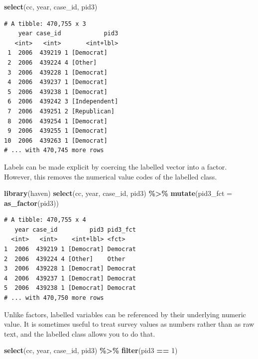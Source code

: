 \documentclass[10pt,article,oneside]{memoir}
\theoremstyle{definition}
\newenvironment{Shaded}{\begin{snugshade}}{\end{snugshade}}
\newcommand{\DataTypeTok}[1]{\textcolor[rgb]{0.13,0.29,0.53}{#1}}
\newcommand{\DecValTok}[1]{\textcolor[rgb]{0.00,0.00,0.81}{#1}}
\newcommand{\KeywordTok}[1]{\textcolor[rgb]{0.13,0.29,0.53}{\textbf{#1}}}
\newcommand{\NormalTok}[1]{#1}
\newcommand{\OperatorTok}[1]{\textcolor[rgb]{0.81,0.36,0.00}{\textbf{#1}}}
\newcommand{\StringTok}[1]{\textcolor[rgb]{0.31,0.60,0.02}{#1}}
\begin{document}
\begin{Shaded}
\begin{Highlighting}[]
\KeywordTok{select}\NormalTok{(cc, year, case\_id, pid3)}
\end{Highlighting}
\end{Shaded}

\begin{verbatim}
# A tibble: 470,755 x 3
    year case_id            pid3
   <int>   <int>       <int+lbl>
 1  2006  439219 1 [Democrat]   
 2  2006  439224 4 [Other]      
 3  2006  439228 1 [Democrat]   
 4  2006  439237 1 [Democrat]   
 5  2006  439238 1 [Democrat]   
 6  2006  439242 3 [Independent]
 7  2006  439251 2 [Republican] 
 8  2006  439254 1 [Democrat]   
 9  2006  439255 1 [Democrat]   
10  2006  439263 1 [Democrat]   
# ... with 470,745 more rows
\end{verbatim}

\noindent Labels can be made explicit by coercing the labelled vector
into a factor. However, this removes the numerical value codes of the
labelled class.

\begin{Shaded}
\begin{Highlighting}[]
\KeywordTok{library}\NormalTok{(haven)}
\KeywordTok{select}\NormalTok{(cc, year, case\_id, pid3) }\OperatorTok{\%\textgreater{}\%}\StringTok{ }
\StringTok{  }\KeywordTok{mutate}\NormalTok{(}\DataTypeTok{pid3\_fct =} \KeywordTok{as\_factor}\NormalTok{(pid3))}
\end{Highlighting}
\end{Shaded}

\begin{verbatim}
# A tibble: 470,755 x 4
   year case_id         pid3 pid3_fct
  <int>   <int>    <int+lbl> <fct>   
1  2006  439219 1 [Democrat] Democrat
2  2006  439224 4 [Other]    Other   
3  2006  439228 1 [Democrat] Democrat
4  2006  439237 1 [Democrat] Democrat
5  2006  439238 1 [Democrat] Democrat
# ... with 470,750 more rows
\end{verbatim}

\noindent Unlike factors, labelled variables can be referenced by their
underlying numeric value. It is sometimes useful to treat survey values
as numbers rather than as raw text, and the labelled class allows you to
do that.

\begin{Shaded}
\begin{Highlighting}[]
\KeywordTok{select}\NormalTok{(cc, year, case\_id, pid3) }\OperatorTok{\%\textgreater{}\%}\StringTok{ }
\StringTok{  }\KeywordTok{filter}\NormalTok{(pid3 }\OperatorTok{==}\StringTok{ }\DecValTok{1}\NormalTok{)}
\end{Highlighting}
\end{Shaded}
\end{document}

